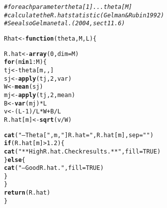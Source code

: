 \documentclass{article}\usepackage[]{graphicx}\usepackage[]{color}
\makeatletter
\newcommand{\hlnum}[1]{\textcolor[rgb]{0.686,0.059,0.569}{#1}}%
\newcommand{\hlstr}[1]{\textcolor[rgb]{0.192,0.494,0.8}{#1}}%
\newcommand{\hlcom}[1]{\textcolor[rgb]{0.678,0.584,0.686}{\textit{#1}}}%
\newcommand{\hlopt}[1]{\textcolor[rgb]{0,0,0}{#1}}%
\newcommand{\hlstd}[1]{\textcolor[rgb]{0.345,0.345,0.345}{#1}}%
\newcommand{\hlkwa}[1]{\textcolor[rgb]{0.161,0.373,0.58}{\textbf{#1}}}%
\newcommand{\hlkwb}[1]{\textcolor[rgb]{0.69,0.353,0.396}{#1}}%
\newcommand{\hlkwc}[1]{\textcolor[rgb]{0.333,0.667,0.333}{#1}}%
\newcommand{\hlkwd}[1]{\textcolor[rgb]{0.737,0.353,0.396}{\textbf{#1}}}%
\newenvironment{kframe}{%
 \def\at@end@of@kframe{}%
 \ifinner\ifhmode%
  \def\at@end@of@kframe{\end{minipage}}%
  \begin{minipage}{\columnwidth}%
 \fi\fi%
 \def\FrameCommand##1{\hskip\@totalleftmargin \hskip-\fboxsep
 \colorbox{shadecolor}{##1}\hskip-\fboxsep
     \hskip-\linewidth \hskip-\@totalleftmargin \hskip\columnwidth}%
 \MakeFramed {\advance\hsize-\width
   \@totalleftmargin\z@ \linewidth\hsize
   \@setminipage}}%
 {\par\unskip\endMakeFramed%
 \at@end@of@kframe}
\newenvironment{knitrout}{}{} %
\makeatother
\begin{document}
\begin{knitrout}
\color{fgcolor}\begin{kframe}
\begin{alltt}
\hlcom{# for each parameter theta[1]...theta[M]}
\hlcom{# calculate the R.hat statistic (Gelman & Rubin 1992)}
\hlcom{# See also Gelman et al. (2004, sect 11.6)}

\hlstd{Rhat} \hlkwb{<-} \hlkwa{function}\hlstd{(}\hlkwc{theta}\hlstd{,} \hlkwc{M}\hlstd{,} \hlkwc{L}\hlstd{) \{}

  \hlstd{R.hat} \hlkwb{<-} \hlkwd{array}\hlstd{(}\hlnum{0}\hlstd{,} \hlkwc{dim}\hlstd{=M)}
  \hlkwa{for} \hlstd{(m} \hlkwa{in} \hlnum{1}\hlopt{:}\hlstd{M) \{}
    \hlstd{tj} \hlkwb{<-} \hlstd{theta[m,,]}
    \hlstd{sj} \hlkwb{<-} \hlkwd{apply}\hlstd{(tj,} \hlnum{2}\hlstd{, var)}
    \hlstd{W} \hlkwb{<-} \hlkwd{mean}\hlstd{(sj)}
    \hlstd{mj} \hlkwb{<-} \hlkwd{apply}\hlstd{(tj,} \hlnum{2}\hlstd{, mean)}
    \hlstd{B} \hlkwb{<-} \hlkwd{var}\hlstd{(mj)}\hlopt{*}\hlstd{L}
    \hlstd{v} \hlkwb{<-} \hlstd{(L}\hlopt{-}\hlnum{1}\hlstd{)}\hlopt{/}\hlstd{L}\hlopt{*}\hlstd{W} \hlopt{+} \hlstd{B}\hlopt{/}\hlstd{L}
    \hlstd{R.hat[m]} \hlkwb{<-} \hlkwd{sqrt}\hlstd{(v}\hlopt{/}\hlstd{W)}

    \hlkwd{cat}\hlstd{(}\hlstr{"-- Theta["}\hlstd{,m,}\hlstr{"] R.hat = "}\hlstd{,R.hat[m],}\hlkwc{sep}\hlstd{=}\hlstr{""}\hlstd{)}
    \hlkwa{if} \hlstd{(R.hat[m]} \hlopt{>} \hlnum{1.2}\hlstd{) \{}
      \hlkwd{cat}\hlstd{(}\hlstr{" ** High R.hat. Check results. **"}\hlstd{,}\hlkwc{fill}\hlstd{=}\hlnum{TRUE}\hlstd{)}
    \hlstd{\}} \hlkwa{else} \hlstd{\{}
      \hlkwd{cat}\hlstd{(}\hlstr{" -- Good R.hat."}\hlstd{,} \hlkwc{fill}\hlstd{=}\hlnum{TRUE}\hlstd{)}
    \hlstd{\}}
  \hlstd{\}}
  \hlkwd{return}\hlstd{(R.hat)}
\hlstd{\}}
\end{alltt}
\end{kframe}
\end{knitrout}
\end{document}
